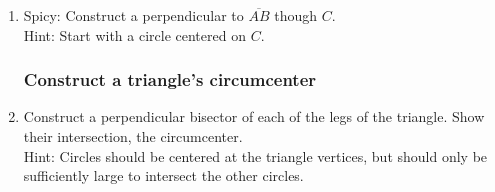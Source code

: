 \begin{enumerate}
\item Spicy: Construct a perpendicular to $\overline{AB}$ though $C$.\\
Hint: Start with a circle centered on $C$.
  \vspace{4cm}
  \begin{center}
\end{center} %

\newpage
\subsubsection*{Construct a triangle's circumcenter}

\item Construct a perpendicular bisector of each of the legs of the triangle. Show their intersection, the circumcenter.\\[0.2cm]
Hint: Circles should be centered at the triangle vertices, but should only be sufficiently large to intersect the other circles.
  \vspace{3cm}
  \begin{center}
  \end{center}

\newpage

\end{enumerate}
